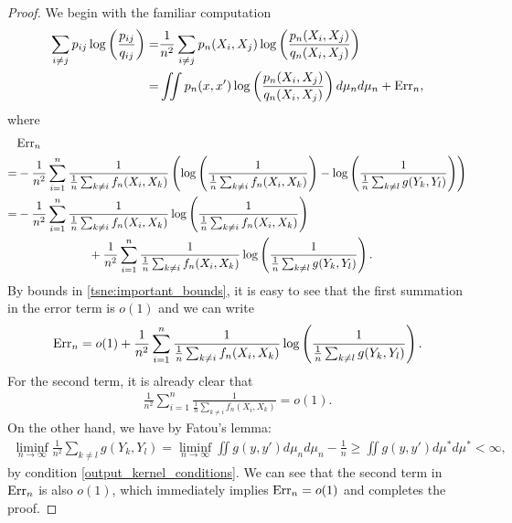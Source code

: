 \begin{proof}
    We begin with the familiar computation
    \begin{align}
        \sum_{i \neq j} p_{ij} \log \left(\frac{p_{ij}}{q_{ij}}\right) = & \frac{1}{n^2}\sum_{i \neq j}p_n(X_i,X_j) \log \left(\frac{p_n(X_i,X_j)}{q_n(X_i,X_j)}\right) \nonumber          \\
        =                                                                & \iint p_n(x,x') \log \left(\frac{p_n(X_i,X_j)}{q_n(X_i,X_j)}\right) d \mu_n d \mu_n + \text{\normalfont Err}_n,
    \end{align}
    where
    \begin{align}
          & \text{\normalfont Err}_n \nonumber                                                                                                                                                                                                   \\
        = & -\frac{1}{n^2}\sum_{i=1}^n\frac{1}{\frac{1}{n}\sum_{k \neq i}f_n(X_i,X_k)}\left(\log \left(\frac{1}{\frac{1}{n}\sum_{k \neq i}f_n(X_i,X_k)}\right)-\log \left(\frac{1}{\frac{1}{n}\sum_{k \neq l}g(Y_k,Y_l)}\right)\right) \nonumber \\
        = & -\frac{1}{n^2}\sum_{i=1}^n\frac{1}{\frac{1}{n}\sum_{k \neq i}f_n(X_i,X_k)}\log \left(\frac{1}{\frac{1}{n}\sum_{k \neq i}f_n(X_i,X_k)}\right) \nonumber                                                                               \\
          & \qquad \qquad \qquad + \frac{1}{n^2}\sum_{i=1}^n\frac{1}{\frac{1}{n}\sum_{k \neq i}f_n(X_i,X_k)}\log \left(\frac{1}{\frac{1}{n}\sum_{k \neq l}g(Y_k,Y_l)}\right).
    \end{align}
    By bounds in \eqref{tsne:important_bounds}, it is easy to see that the first summation in the error term is $o(1)$ and we can write
    \begin{align}
        \text{\normalfont Err}_n = o(1) + \frac{1}{n^2}\sum_{i=1}^n\frac{1}{\frac{1}{n}\sum_{k \neq i}f_n(X_i,X_k)}\log \left(\frac{1}{\frac{1}{n}\sum_{k \neq l}g(Y_k,Y_l)}\right).
    \end{align}
    For the second term, it is already clear that
    \begin{align}
        \frac{1}{n^2}\sum_{i=1}^n\frac{1}{\frac{1}{n}\sum_{k \neq i}f_n(X_i,X_k)} = o(1).
    \end{align}
    On the other hand, we have by Fatou's lemma:
    \begin{align}
        \liminf_{n \to \infty}\frac{1}{n^2} \sum_{k \neq l}g(Y_k,Y_l) = \liminf_{n \to \infty} \iint g(y,y') d\mu_n d\mu_n - \frac{1}{n} \geq \iint g(y,y') d\mu^* d\mu^* < \infty,
    \end{align}
    by condition \ref{output_kernel_conditions}. We can see that the second term in $\text{\normalfont Err}_n$ is also $o(1)$, which immediately implies $\text{\normalfont Err}_n = o(1)$ and completes the proof.
\end{proof}
